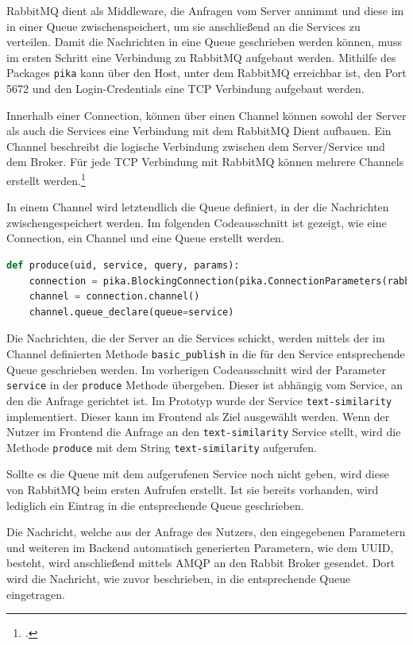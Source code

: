 RabbitMQ dient als Middleware, die Anfragen vom Server annimmt und diese im in einer Queue zwischenspeichert, um sie anschließend an die Services zu verteilen. Damit die Nachrichten in eine Queue geschrieben werden können, muss im ersten Schritt eine Verbindung zu RabbitMQ aufgebaut werden. Mithilfe des Packages \texttt{pika} kann über den Host, unter dem RabbitMQ erreichbar ist, den Port 5672 und den Login-Credentials eine TCP Verbindung aufgebaut werden.

Innerhalb einer Connection, können über einen Channel können sowohl der Server als auch die Services eine Verbindung mit dem RabbitMQ Dient aufbauen. Ein Channel beschreibt die logische Verbindung zwischen dem Server/Service und dem Broker. Für jede TCP Verbindung mit RabbitMQ können mehrere Channels erstellt werden.\footcite{dossot2014rabbitmq}

In einem Channel wird letztendlich die Queue definiert, in der die Nachrichten zwischengespeichert werden. Im folgenden Codeausschnitt ist gezeigt, wie eine Connection, ein Channel und eine Queue erstellt werden.

\begin{lstlisting}[language=Python]
def produce(uid, service, query, params):
    connection = pika.BlockingConnection(pika.ConnectionParameters(rabbit_host, 5672, '/', credentials))
    channel = connection.channel()
    channel.queue_declare(queue=service)
\end{lstlisting}

Die Nachrichten, die der Server an die Services schickt, werden mittels der im Channel definierten Methode \texttt{basic\_{}publish} in die für den Service entsprechende Queue geschrieben werden. Im vorherigen Codeausschnitt wird der Parameter \texttt{service} in der \texttt{produce} Methode übergeben. Dieser ist abhängig vom Service, an den die Anfrage gerichtet ist. Im Prototyp wurde der Service \texttt{text-similarity} implementiert. Dieser kann im Frontend als Ziel ausgewählt werden. Wenn der Nutzer im Frontend die Anfrage an den \texttt{text-similarity} Service stellt, wird die Methode \texttt{produce} mit dem String \texttt{\glqq text-similarity\grqq{}} aufgerufen.

Sollte es die Queue mit dem aufgerufenen Service noch nicht geben, wird diese von RabbitMQ beim ersten Aufrufen erstellt. Ist sie bereits vorhanden, wird lediglich ein Eintrag in die entsprechende Queue geschrieben.

Die Nachricht, welche aus der Anfrage des Nutzers, den eingegebenen Parametern und weiteren im Backend automatisch generierten Parametern, wie dem UUID, besteht, wird anschließend mittels AMQP an den Rabbit Broker gesendet. Dort wird die Nachricht, wie zuvor beschrieben, in die entsprechende Queue eingetragen. 

